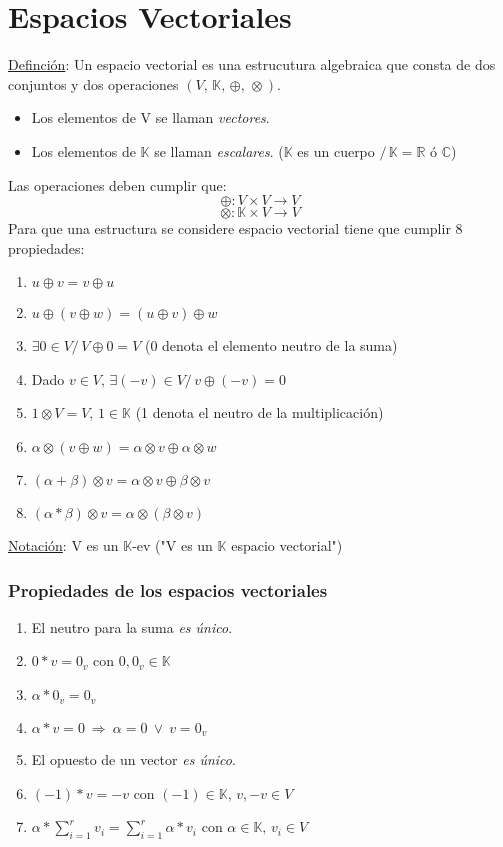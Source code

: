 \documentclass{article}
\newcommand{\comma}{,\,}                                %
\newcommand{\tq}{/\,}                                   %
\newcommand{\vees}{\:\vee\:}                            %
\newcommand{\complejos}{\mathbb{C}}                     %
\newcommand{\cuerpo}{\mathbb{K}}                        %
\newcommand{\reales}{\mathbb{R}}                        %
\newcommand{\Rightarrows}{\: \Rightarrow \:}            %
\newcommand{\sumatoria}[2]{\sum_{#1} ^{#2}}             %
\begin{document}
\section{Espacios Vectoriales}
\underline{Definción}: Un espacio vectorial es una estrucutura algebraica que consta de dos conjuntos y dos operaciones $(V \comma \cuerpo \comma \oplus \comma \otimes)$.
\begin{itemize}
    \item Los elementos de V se llaman \emph{vectores}.
    \item Los elementos de $\cuerpo$ se llaman \emph{escalares}. ($\cuerpo$ es un cuerpo $\tq \cuerpo = \reales$ ó $\complejos$)
\end{itemize}
Las operaciones deben cumplir que:
\begin{equation*}
    \oplus : V \times V \rightarrow V
\end{equation*}
\begin{equation*}
    \otimes : \cuerpo \times V \rightarrow V
\end{equation*}
Para que una estructura se considere espacio vectorial tiene que cumplir 8 propiedades:
\begin{enumerate}
    \item $u \oplus v = v \oplus u$
    \item $u \oplus (v \oplus w) = (u \oplus v) \oplus w$
    \item $\exists 0 \in V\tq V \oplus 0 = V$ (0 denota el elemento neutro de la suma)
    \item Dado $v \in V \comma \exists (-v) \in V \tq v \oplus (-v) = 0$
    \item $1 \otimes V = V \comma 1 \in \cuerpo$ (1 denota el neutro de la multiplicación)
    \item $\alpha \otimes (v \oplus w) = \alpha \otimes v \oplus \alpha \otimes w$
    \item $(\alpha + \beta) \otimes v = \alpha \otimes v \oplus \beta \otimes v$
    \item $(\alpha * \beta ) \otimes v = \alpha \otimes (\beta \otimes v)$
\end{enumerate}
\underline{Notación}: V es un $\cuerpo$-ev ("V es un $\cuerpo$ espacio vectorial")
\subsubsection*{Propiedades de los espacios vectoriales}
\begin{enumerate}
    \item El neutro para la suma \emph{es único}.
    \item $0 * v = 0_v$ con $0,0_v \in \cuerpo$
    \item $\alpha * 0_v = 0_v$
    \item $\alpha * v = 0 \Rightarrows \alpha = 0 \vees v = 0_v$
    \item El opuesto de un vector \emph{es único}.
    \item $(-1) * v  = -v$ con $(-1) \in \cuerpo \comma v,-v \in V$
    \item $\alpha * \sumatoria{i=1}{r} v_i = \sumatoria{i=1}{r} \alpha * v_i$ con $\alpha \in \cuerpo \comma v_i \in V$
\end{enumerate}
\end{document}
